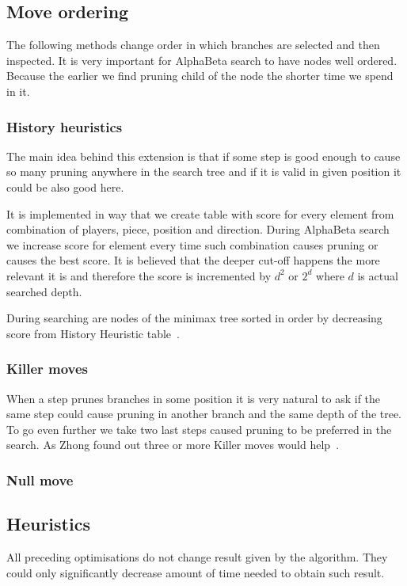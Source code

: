 \subsection{Move ordering}
The following methods change order in which branches are selected and then
inspected. It is very important for AlphaBeta search to have nodes well
ordered. Because the earlier we find pruning child of the node the shorter time
we spend in it.

	\subsubsection{History heuristics}
	The main idea behind this extension is that if some step is good enough
	to cause so many pruning anywhere in the search tree and if it is valid in
	given position it could be also good here.

	It is implemented in way that we create table with score for every element
	from combination of players, piece, position and direction. During
	AlphaBeta search we increase score for element every time such combination
	causes pruning or causes the best score. It is believed that the deeper
	cut-off happens the more relevant it is and therefore the score is
	incremented by $d^2$ or $2^d$ where $d$ is actual searched depth.

	During searching are nodes of the minimax tree sorted in order by
	decreasing score from History Heuristic table~\cite{COX}.

	\subsubsection{Killer moves}
	When a step prunes branches in some position it is very natural to ask if
	the same step could cause pruning in another branch and the same depth of
	the tree. To go even further we take two last steps caused pruning to be
	preferred in the search. As Zhong found out three or more Killer moves would help~\cite{ZHONG}.

	\subsubsection{Null move}


\subsection{Heuristics}
All preceding optimisations do not change result given by the algorithm. They
could only significantly decrease amount of time needed to obtain such result.

